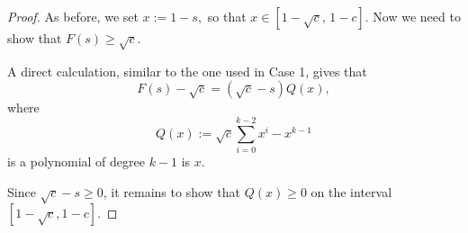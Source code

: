 \documentclass[12pt]{article}
\theoremstyle{plain}
\theoremstyle{definition}
\theoremstyle{remark}
\begin{document}
\begin{proof}
As before, we set $x:=1-s,$ so that $x\in[1-\sqrt{c},\,1-c]$. Now we need to show that $F(s)\ge\sqrt c$.


A direct calculation, similar to the one used in Case 1, gives that
\begin{equation}\label{eq3}
F(s)-\sqrt c=(\sqrt c-s)Q(x),
\end{equation}
where
\[
Q(x):=\sqrt{c}\sum_{i=0}^{k-2}x^i-x^{k-1}
\]
is a polynomial of degree $k-1$ is $x$.

Since $\sqrt{c}-s\ge 0$, it remains to show that $Q(x)\ge 0$ on the interval $[1-\sqrt{c},1-c]$.


\end{proof}
\end{document}
